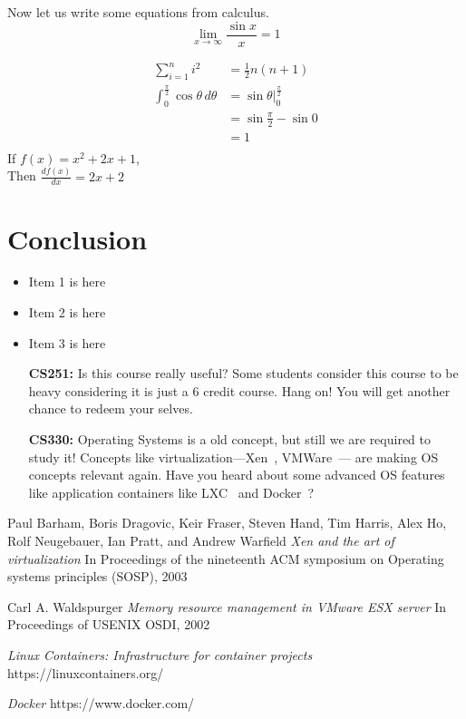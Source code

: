 \documentclass[a4paper, 10pt,twocolumn]{article}
\begin{document}
Now let us write some equations from calculus.
\begin{equation*}
\lim_{x \to \infty} \frac{\sin x}{x} = 1
\end{equation*}

\begin{align*}
\sum_{i=1}^n i^2 &= \frac{1}{2} n (n+1) \\
\int_0^{\frac{\pi}{2}} \cos\theta\,d\theta &= \sin\theta\Big|_0^\frac{\pi}{2} \\
  &= \sin\frac{\pi}{2} - \sin 0 \\
  &= 1 \\
\end{align*}
If  $f(x) = x^2 + 2x + 1$, \\ 
Then  $\frac{df(x)}{dx} = 2x + 2$ 
\section{Conclusion}
\lipsum[30]
\begin{itemize}
\item Item 1 is here
\item Item 2 is here
\item Item 3 is here
\end{itemize}

\begin{itemize}
\item[{\bf CS251:}] Is this course really useful? Some students consider this course to
                    be heavy considering it is just a 6 credit course. Hang on! You will 
                    get another chance to redeem your selves.
\item[{\bf CS330:}] Operating Systems is a old concept, but still we are required to study it! 
                    Concepts like virtualization---Xen~\cite{xen}, VMWare~\cite{vmware}--- are
                    making OS concepts relevant again. Have you heard about some advanced OS features like 
                    application containers like LXC~\cite{lxc} and Docker~\cite{docker}?   
\end{itemize}


\begin{thebibliography}{25}
Paul Barham, Boris Dragovic, Keir Fraser, Steven Hand, Tim Harris, Alex Ho, Rolf Neugebauer, Ian Pratt, and Andrew Warfield
\textit{Xen and the art of virtualization}
In Proceedings of the nineteenth ACM symposium on Operating systems principles (SOSP), 2003

Carl A. Waldspurger
\textit{Memory resource management in VMware ESX server}
In Proceedings of USENIX OSDI, 2002


\textit{Linux Containers: Infrastructure for container projects}
https://linuxcontainers.org/


\textit{Docker}
https://www.docker.com/

\end{thebibliography}
\end{document}

